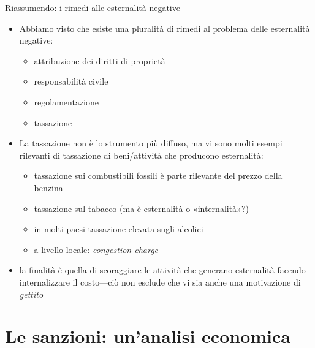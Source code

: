 \documentclass[aspectratio=64,12pt]{beamer}
\begin{document}
\begin{frame}{Riassumendo: i rimedi alle esternalità negative}
\begin{itemize}
\item Abbiamo visto che esiste una pluralità di rimedi al problema delle
esternalità negative:
\begin{itemize}
\item attribuzione dei diritti di proprietà
\item responsabilità civile
\item regolamentazione
\item tassazione
\end{itemize}
\item La tassazione non è lo strumento più diffuso, ma vi sono molti esempi
rilevanti di tassazione di beni/attività che producono esternalità:
\begin{itemize}
\item tassazione sui combustibili fossili è parte rilevante del prezzo della
benzina
\item tassazione sul tabacco (ma è esternalità o «internalità»?)
\item in molti paesi tassazione elevata sugli alcolici
\item a livello locale: \emph{congestion charge}
\end{itemize}
\item la finalità è quella di scoraggiare le attività che generano esternalità
facendo internalizzare il costo---ciò non esclude che vi sia anche una
motivazione di \emph{gettito}
\end{itemize}
\end{frame}

\section{Le sanzioni: un'analisi economica}
\end{document}
